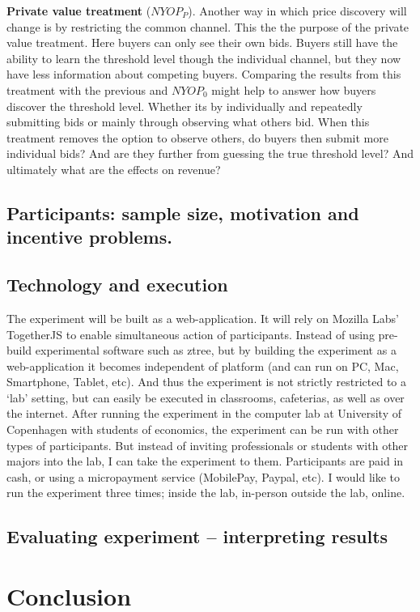 \documentclass[a4paper,12pt]{article}
\begin{document}
	{\bf Private value treatment} ($NYOP_P$).
	Another way in which price discovery will change is by restricting the common channel. This the the purpose of the private value treatment. Here buyers can only see their own bids. Buyers still have the ability to learn the threshold level though the individual channel, but they now have less information about competing buyers. Comparing the results from this treatment with the previous and $NYOP_0$ might help to answer how buyers discover the threshold level. Whether its by individually and repeatedly submitting bids or mainly through observing what others bid. When this treatment removes the option to observe others, do buyers then submit more individual bids? And are they further from guessing the true threshold level? And ultimately what are the effects on revenue? 

	\subsection{Participants: sample size, motivation and incentive problems.}


	\subsection{Technology and execution}
	The experiment will be built as a web-application. It will rely on Mozilla Labs' TogetherJS to enable simultaneous action of participants. Instead of using pre-build experimental software such as ztree, but by building the experiment as a web-application it becomes independent of platform (and can run on PC, Mac, Smartphone, Tablet, etc). And thus the experiment is not strictly restricted to a `lab' setting, but can easily be executed in classrooms, cafeterias, as well as over the internet. After running the experiment in the computer lab at University of Copenhagen with students of economics, the experiment can be run with other types of participants. But instead of inviting professionals or students with other majors into the lab, I can take the experiment to them. Participants are paid in cash, or using a micropayment service (MobilePay, Paypal, etc). I would like to run the experiment three times; inside the lab, in-person outside the lab, online.


	\subsection{Evaluating experiment -- interpreting results}
	
	\section{Conclusion}
	
			
	\newpage
	


	\nocite{*}
%
%
\end{document}
